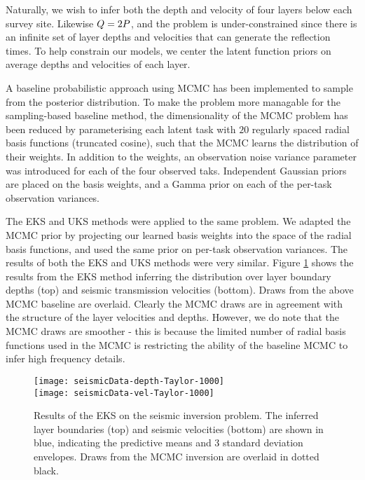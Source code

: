 Naturally, we wish to infer both the depth and velocity of four layers below
each survey site. Likewise $Q = 2P$, and the problem is
under-constrained since there is an infinite set of layer depths and
velocities that can generate the reflection times. To help constrain our
models, we center the latent function priors on average depths and velocities
of each layer.


A baseline probabilistic approach using MCMC has been implemented to sample from
the posterior distribution. To make the problem more managable for the sampling-based baseline method, 
the dimensionality of the 
MCMC problem has been reduced by parameterising each latent task with $20$ 
regularly spaced radial basis functions (truncated cosine), such that the MCMC
learns the distribution of their weights. In addition to the weights, an 
observation noise variance parameter was introduced for each of the four 
observed taks. Independent Gaussian priors are placed on the basis weights, and 
a Gamma prior on each of the per-task observation variances.

The EKS and UKS methods were applied to the same problem. We adapted the MCMC 
prior by projecting our learned basis weights into the space of the radial 
basis functions, and used the same prior on per-task observation variances. 
The results of both the EKS and UKS methods were very similar. Figure 
\ref{fig:seismic_result} shows the results from the EKS method inferring the 
distribution over layer boundary depths (top) and seismic transmission 
velocities (bottom). Draws from the above MCMC baseline are overlaid. Clearly
the MCMC draws are in agreement with the structure of the layer velocities and 
depths. However, we do note that the MCMC draws are smoother - this is 
because the limited number of radial basis functions used in the MCMC is 
restricting the ability of the baseline MCMC to infer high frequency details.

\begin{figure}
\texttt{[image: seismicData-depth-Taylor-1000]} \\
\texttt{[image: seismicData-vel-Taylor-1000]}
\caption{Results of the EKS on the seismic inversion problem. The inferred 
    layer boundaries (top) and seismic velocities (bottom) are shown in blue, 
    indicating the predictive means and 3 standard deviation envelopes. Draws
    from the MCMC inversion are overlaid in dotted black.}
 \label{fig:seismic_result}
\end{figure}

